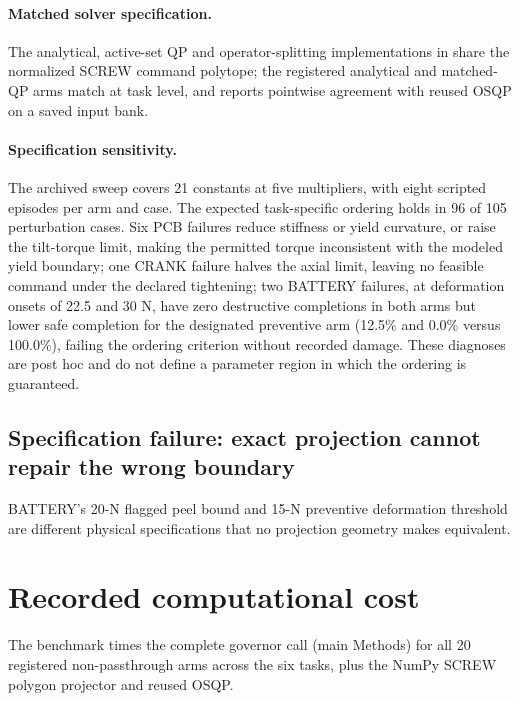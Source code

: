 \documentclass[10pt]{article}
\let\suppsection\suppname
\begin{document}
\paragraph{Matched solver specification.}
The analytical, active-set QP and operator-splitting implementations in
 share the normalized SCREW command
polytope; the registered analytical and matched-QP arms match at task level,
and \suppsection{S8} reports pointwise agreement with reused OSQP on a saved
input bank.

\paragraph{Specification sensitivity.}
The archived sweep covers 21 constants at five multipliers, with eight scripted episodes per arm and case. The expected task-specific ordering holds in 96 of 105 perturbation cases.
Six PCB failures reduce stiffness or yield curvature, or raise the
tilt-torque limit, making the permitted torque inconsistent with the modeled
yield boundary; one CRANK failure halves the axial limit, leaving no feasible
command under the declared tightening; two BATTERY failures, at deformation
onsets of 22.5 and 30 N, have zero destructive completions in both arms but
lower safe completion for the designated preventive arm (12.5\% and 0.0\%
versus 100.0\%), failing the ordering criterion without recorded damage. These diagnoses are post hoc and do not define a parameter region in which the ordering is guaranteed.

\subsection{Specification failure: exact projection cannot repair the wrong boundary}

BATTERY's 20-N flagged peel bound and 15-N preventive deformation threshold are different physical specifications that no projection geometry makes equivalent.



\section{Recorded computational cost}
\label{sec:si-runtime}

The benchmark times the complete governor call (main Methods) for all 20
registered non-passthrough arms across the six tasks, plus the NumPy SCREW
polygon projector and reused OSQP.
\end{document}

